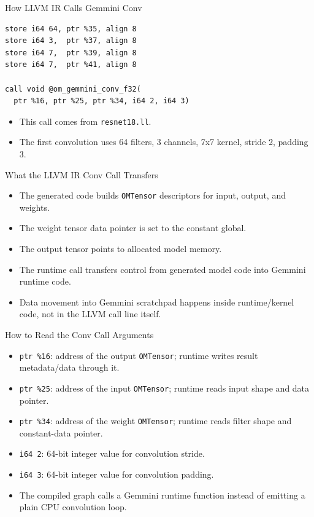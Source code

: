 \documentclass[aspectratio=169,10pt]{beamer}
\newcommand{\code}[1]{\texttt{\footnotesize #1}}
\begin{document}
\begin{frame}[fragile]{How LLVM IR Calls Gemmini Conv}
  \begin{lstlisting}
store i64 64, ptr %35, align 8
store i64 3,  ptr %37, align 8
store i64 7,  ptr %39, align 8
store i64 7,  ptr %41, align 8

call void @om_gemmini_conv_f32(
  ptr %16, ptr %25, ptr %34, i64 2, i64 3)
  \end{lstlisting}
  \begin{itemize}
    \item This call comes from \code{resnet18.ll}.
    \item The first convolution uses 64 filters, 3 channels, 7x7 kernel, stride 2, padding 3.
  \end{itemize}
\end{frame}

\begin{frame}{What the LLVM IR Conv Call Transfers}
  \begin{itemize}
    \item The generated code builds \code{OMTensor} descriptors for input, output, and weights.
    \item The weight tensor data pointer is set to the constant global.
    \item The output tensor points to allocated model memory.
    \item The runtime call transfers control from generated model code into Gemmini runtime code.
    \item Data movement into Gemmini scratchpad happens inside runtime/kernel code, not in the LLVM call line itself.
  \end{itemize}
\end{frame}

\begin{frame}{How to Read the Conv Call Arguments}
  \begin{itemize}
    \item \code{ptr \%16}: address of the output \code{OMTensor}; runtime writes result metadata/data through it.
    \item \code{ptr \%25}: address of the input \code{OMTensor}; runtime reads input shape and data pointer.
    \item \code{ptr \%34}: address of the weight \code{OMTensor}; runtime reads filter shape and constant-data pointer.
    \item \code{i64 2}: 64-bit integer value for convolution stride.
    \item \code{i64 3}: 64-bit integer value for convolution padding.
    \item The compiled graph calls a Gemmini runtime function instead of emitting a plain CPU convolution loop.
  \end{itemize}
\end{frame}
\end{document}
